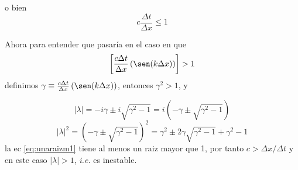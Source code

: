 \documentclass{article}
\begin{document}
o bien
\begin{equation}
	c  \frac{\Delta t}{\Delta x} \leq 1
\end{equation}

Ahora para entender que pasaría en el caso en que 
\begin{equation}
	 \left[ \frac{c\Delta t}{\Delta x}\left( \sen(k\Delta x) \right) \right] > 1
\end{equation}
definimos $\gamma \equiv \frac{c\Delta t}{\Delta x}\left( \sen(k\Delta x) \right)$, entonces $\gamma^2 > 1$, y

\begin{equation}
	\left| \lambda \right| = -i\gamma \pm i\sqrt{\gamma^2 - 1} = i \left( -\gamma \pm \sqrt{\gamma^2 - 1} \right)
\end{equation}
\begin{equation}
	\left| \lambda \right|^2 = \left( -\gamma \pm \sqrt{\gamma^2 -1} \right)^2 = \gamma^2 \pm 2\gamma\sqrt{\gamma^2 -1} + \gamma^2-1
	\label{eq:unaraizm1}
\end{equation}
la ec \eqref{eq:unaraizm1} tiene al menos un raiz mayor que 1, por tanto $c > \Delta x / \Delta t$ y en este caso $|\lambda| > 1$, \textit{i.e. } es inestable.
\end{document}

